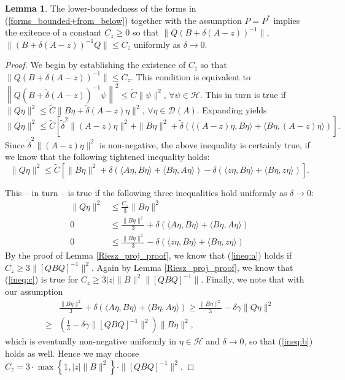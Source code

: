\documentclass[reqno,12pt,letterpaper]{amsart}
\numberwithin{equation}{section}
\newcommand{\1}{\mathds{1}}
\theoremstyle{definition}
\newtheorem{Lem}[Th]{Lemma}
\begin{document}
\begin{Lem}\label{bddness_lemma}
	The lower-boundedness of the forms in (\ref{forms_bounded+from_below}) together with the assumption $P = P^* $ implies the exitence of
	a constant 
	$C_z \geq 0$ so that $\|Q( B + \delta (A-z))^{-1}\|$, $\|(B + \delta (A-z))^{-1}Q\| \leq C_z$ uniformly as $\delta \to 0$.
\end{Lem}
\begin{proof}
	We begin by establishing the existence of $C_z$ so that  $\|Q( B + \delta (A-z))^{-1}\| \leq C_z$. This condition is equivalent to 
	$
	\left\| Q (B + \tilde{\delta} (A - z))^{-1} \psi \right\|^2 \leq \tilde{C} \|\psi\|^2$,  $\forall \psi \in \mathcal{H}
	$.
	This in turn is true  if
	$
	\|Q \eta\|^2 \leq \tilde{C} \| B \eta + \tilde{\delta} (A - z) \eta \|^2$,  $\forall \eta \in \mathcal{D}(A).
	$
	Expanding  yields
	\[
	\|Q \eta\|^2 \leq \tilde{C} \left[ \tilde{\delta}^2 \|(A - z) \eta\|^2 + \|B \eta\|^2 + \tilde{\delta} \left( \langle (A - z) \eta, B \eta \rangle + \langle B \eta, (A - z) \eta \rangle \right) \right].
	\]
	Since $\tilde{\delta}^2 \|(A - z) \eta\|^2 $ is non-negative, the above inequality is certainly true, if we know that the following tightened inequality holds:
	\[
	\|Q \eta\|^2 \leq \tilde{C} \left[  \|B \eta\|^2 + \delta \left( \langle A  \eta, B \eta \rangle + \langle B \eta, A  \eta \rangle \right)
	-
	\delta \left( \langle z  \eta, B \eta \rangle + \langle B \eta, z  \eta \rangle \right) 
	\right].
	\]
	
	This -- in turn -- is true if the following three inequalities hold uniformly as $\delta \to 0$:
	\begin{subequations}\label{ineq:main}
		\begin{align}
			\|Q \eta\|^2 &\leq \frac{C_z}{3} \|B\eta\|^2 \label{ineq:a} \\
			0 &\leq  \frac{\|B\eta\|^2}{3} + \delta \left( \langle A  \eta, B \eta \rangle + \langle B \eta, A  \eta \rangle \right) \label{ineq:b} \\
			0 &\leq  \frac{\|B\eta\|^2}{3}  -
			\delta \left( \langle z  \eta, B \eta \rangle + \langle B \eta, z  \eta \rangle \right) \label{ineq:c}
		\end{align}
	\end{subequations} 
	By the proof of Lemma \ref{Riesz_proj_proof}, we know that (\ref{ineq:a}) holds if $C_z \geq 3 \|[Q B Q]^{-1}\|^2$. Again by Lemma \ref{Riesz_proj_proof}, we know that (\ref{ineq:c}) is true for $C_z \geq  3 |z|\|B\|^2 \|[Q B Q]^{-1}\|$. Finally, we note that with our assumption 
	\begin{align}
		&\frac{\|B\eta\|^2}{3} + \delta \left( \langle A  \eta, B \eta \rangle + \langle B \eta, A  \eta \rangle \right)
		\geq   \frac{\|B\eta\|^2}{3}  - \delta \gamma \|Q \eta\| ^2\\
		\geq&  \left( \frac{1}{3}- \delta \gamma   \|[Q B Q]^{-1}\|^2\right)\|B\eta\| ^2,
	\end{align}
	which is eventually non-negative uniformly in $\eta \in \mathcal{H}$ and $\delta \to 0$, so that (\ref{ineq:b}) holds as well. Hence we may choose $C_z = 3\cdot  \max\left\{1, |z|\|B\|^2\right\}\cdot  \|[Q B Q]^{-1}\|^2$.
	

\end{proof}
\end{document}
